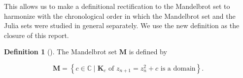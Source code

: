 \documentclass[a4paper,11pt]{article}
\theoremstyle{definition}
\newtheorem{defn}[prop]{Definition}
\begin{document}
This allows us to make a definitional rectification to the Mandelbrot set to harmonize with the chronological order in which the Mandelbrot set and the Julia sets were studied in general separately. We use the new definition as the closure of this report. 

\begin{defn}[{\autocite[Page 9]{belk}}]
The Mandelbrot set $\mathbf{M}$ is defined by

\begin{equation*}
\mathbf{M} = \left\{c\in\mathbb{C} \mid \mathbf{K}_c \text{ of } z_{n+1} = z_n^2 + c \text{ is a domain}\right\}.
\end{equation*}
\end{defn}

\printbibliography %
\end{document}
